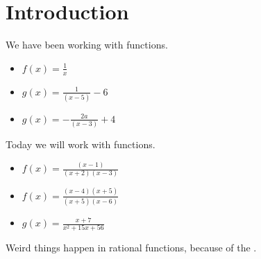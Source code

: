 \section{Introduction}

We have been working with  functions.

\vspace{0.5em}
\begin{minipage}{0.3\textwidth}
    \centering
    \begin{itemize}[nosep]
        \item $f(x) = \frac{1}{x}$
    \end{itemize}
\end{minipage}
\hfil
\begin{minipage}{0.3\textwidth}
    \centering
    \begin{itemize}[nosep]
        \item $g(x) = \frac{1}{(x-5)} -6$
    \end{itemize}
\end{minipage}
\hfil
\begin{minipage}{0.3\textwidth}
    \centering
    \begin{itemize}[nosep]
        \item $g(x) = -\frac{2a}{(x-3)} + 4$
    \end{itemize}
\end{minipage}
\vspace{0.5em}


Today we will work with  functions.

\vspace{0.5em}
\begin{minipage}{0.3\textwidth}
    \centering
    \begin{itemize}[nosep]
        \item $f(x) = \frac{(x-1)}{(x+2)(x-3)}$
    \end{itemize}
\end{minipage}
\hfil
\begin{minipage}{0.3\textwidth}
    \centering
    \begin{itemize}[nosep]
        \item $f(x) = \frac{(x-4)(x+5)}{(x+5)(x-6)}$
    \end{itemize}
\end{minipage}
\hfil
\begin{minipage}{0.3\textwidth}
    \centering
    \begin{itemize}[nosep]
        \item $g(x) = \frac{x+7}{x^2 + 15x + 56}$
    \end{itemize}
\end{minipage}
\vspace{0.5em}

\begin{myCenteredBox}[width=4.5in,]
    Weird things happen in rational functions,
    because of the .
\end{myCenteredBox}